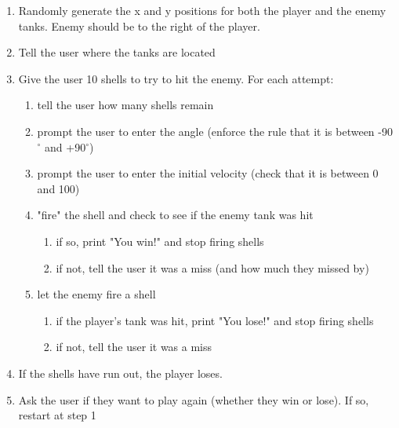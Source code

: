 \documentclass{article}
\begin{document}
\begin{enumerate}
	\item Randomly generate the x and y positions for both the player and the enemy tanks. Enemy should be to the right of the player.
	\item Tell the user where the tanks are located
	\item Give the user 10 shells to try to hit the enemy.  For each attempt:
	\begin{enumerate}
		\item tell the user how many shells remain
		\item prompt the user to enter the angle (enforce the rule that it is between -90$^\circ$ and +90$^\circ$)
		\item prompt the user to enter the initial velocity (check that it is between 0 and 100)
		\item "fire" the shell and check to see if the enemy tank was hit
		\begin{enumerate}
			\item if so, print "You win!" and stop firing shells
			\item if not, tell the user it was a miss (and how much they missed by)
		\end{enumerate}
	\item let the enemy fire a shell
	\begin{enumerate}
		\item if the player's tank was hit, print "You lose!" and stop firing shells
		\item if not, tell the user it was a miss
	\end{enumerate}
	\end{enumerate}
	\item If the shells have run out, the player loses. 
	\item Ask the user if they want to play again (whether they win or lose).  If so, restart at step 1
\end{enumerate}
\end{document}
